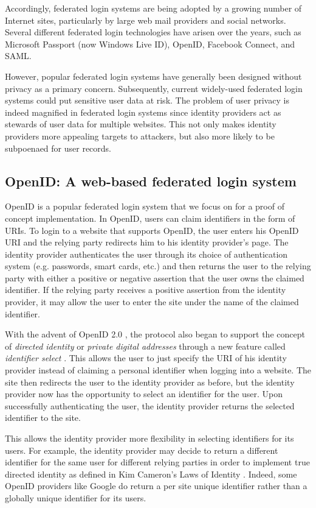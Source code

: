 \documentclass[11pt]{llncs}
\begin{document}
Accordingly, federated login systems are being adopted by a growing
number of Internet sites, particularly by large web mail providers and
social networks.  Several different federated login technologies have
arisen over the years, such as Microsoft Passport (now Windows Live
ID), OpenID, Facebook Connect, and SAML.

However, popular federated login systems have generally been designed
without privacy as a primary concern. Subsequently, current
widely-used federated login systems could put sensitive user data at
risk. The problem of user privacy is indeed magnified in federated
login systems since identity providers act as stewards of user data
for multiple websites. This not only makes identity providers more
appealing targets to attackers, but also more likely to be subpoenaed
for user records.

\subsection{OpenID: A web-based federated login system}

OpenID is a popular federated login system that we focus on for a
proof of concept implementation. In OpenID, users can claim
identifiers in the form of URIs. To login to a website that supports
OpenID, the user enters his OpenID URI and the relying party redirects
him to his identity provider's page. The identity provider
authenticates the user through its choice of authentication system
(e.g. passwords, smart cards, etc.) and then returns the user to the
relying party with either a positive or negative assertion that the
user owns the claimed identifier. If the relying party receives a
positive assertion from the identity provider, it may allow the user
to enter the site under the name of the claimed identifier.

With the advent of OpenID 2.0 \cite{OID2}, the protocol also began to
support the concept of \emph{directed identity} \cite{Cam06} or
\emph{private digital addresses} through a new feature called
\emph{identifier select} \cite{RR06}.  This allows the user to just
specify the URI of his identity provider instead of claiming a
personal identifier when logging into a website. The site then
redirects the user to the identity provider as before, but the
identity provider now has the opportunity to select an identifier for
the user. Upon successfully authenticating the user, the identity
provider returns the selected identifier to the site.

This allows the identity provider more flexibility in selecting
identifiers for its users. For example, the identity provider may
decide to return a different identifier for the same user for
different relying parties in order to implement true directed identity
as defined in Kim Cameron's Laws of Identity \cite{Cam06}. Indeed,
some OpenID providers like Google do return a per site unique
identifier rather than a globally unique identifier for its users.
\end{document}

